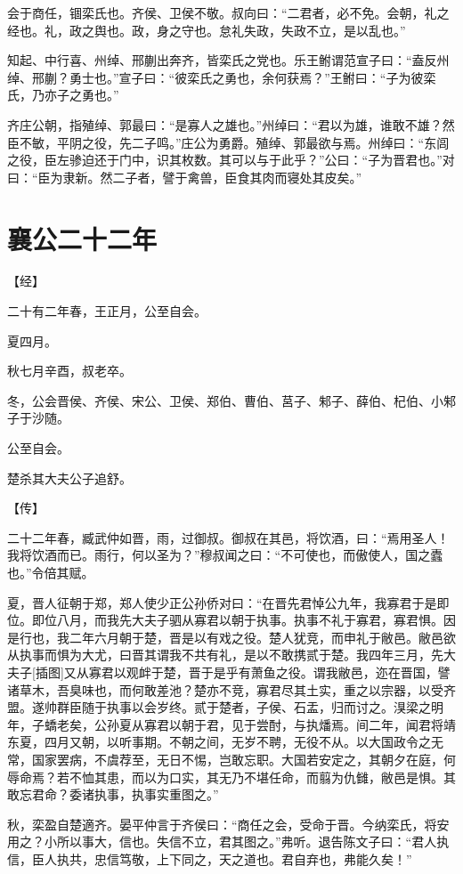 \documentclass[a4paper,12pt,UTF8,twoside]{ctexbook}
\begin{document}
会于商任，锢栾氏也。齐侯、卫侯不敬。叔向曰：“二君者，必不免。会朝，礼之经也。礼，政之舆也。政，身之守也。怠礼失政，失政不立，是以乱也。”

知起、中行喜、州绰、邢蒯出奔齐，皆栾氏之党也。乐王鲋谓范宣子曰：“盍反州绰、邢蒯？勇士也。”宣子曰：“彼栾氏之勇也，余何获焉？”王鲋曰：“子为彼栾氏，乃亦子之勇也。”

齐庄公朝，指殖绰、郭最曰：“是寡人之雄也。”州绰曰：“君以为雄，谁敢不雄？然臣不敏，平阴之役，先二子鸣。”庄公为勇爵。殖绰、郭最欲与焉。州绰曰：“东闾之役，臣左骖迫还于门中，识其枚数。其可以与于此乎？”公曰：“子为晋君也。”对曰：“臣为隶新。然二子者，譬于禽兽，臣食其肉而寝处其皮矣。”

\section{襄公二十二年}



【经】

二十有二年春，王正月，公至自会。

夏四月。

秋七月辛酉，叔老卒。

冬，公会晋侯、齐侯、宋公、卫侯、郑伯、曹伯、莒子、邾子、薛伯、杞伯、小邾子于沙随。

公至自会。

楚杀其大夫公子追舒。

【传】

二十二年春，臧武仲如晋，雨，过御叔。御叔在其邑，将饮酒，曰：“焉用圣人！我将饮酒而已。雨行，何以圣为？”穆叔闻之曰：“不可使也，而傲使人，国之蠹也。”令倍其赋。

夏，晋人征朝于郑，郑人使少正公孙侨对曰：“在晋先君悼公九年，我寡君于是即位。即位八月，而我先大夫子驷从寡君以朝于执事。执事不礼于寡君，寡君惧。因是行也，我二年六月朝于楚，晋是以有戏之役。楚人犹竞，而申礼于敝邑。敝邑欲从执事而惧为大尤，曰晋其谓我不共有礼，是以不敢携贰于楚。我四年三月，先大夫子[插图]又从寡君以观衅于楚，晋于是乎有萧鱼之役。谓我敝邑，迩在晋国，譬诸草木，吾臭味也，而何敢差池？楚亦不竞，寡君尽其土实，重之以宗器，以受齐盟。遂帅群臣随于执事以会岁终。贰于楚者，子侯、石盂，归而讨之。湨梁之明年，子蟜老矣，公孙夏从寡君以朝于君，见于尝酎，与执燔焉。间二年，闻君将靖东夏，四月又朝，以听事期。不朝之间，无岁不聘，无役不从。以大国政令之无常，国家罢病，不虞荐至，无日不惕，岂敢忘职。大国若安定之，其朝夕在庭，何辱命焉？若不恤其患，而以为口实，其无乃不堪任命，而翦为仇雠，敝邑是惧。其敢忘君命？委诸执事，执事实重图之。”

秋，栾盈自楚適齐。晏平仲言于齐侯曰：“商任之会，受命于晋。今纳栾氏，将安用之？小所以事大，信也。失信不立，君其图之。”弗听。退告陈文子曰：“君人执信，臣人执共，忠信笃敬，上下同之，天之道也。君自弃也，弗能久矣！”
\end{document}
